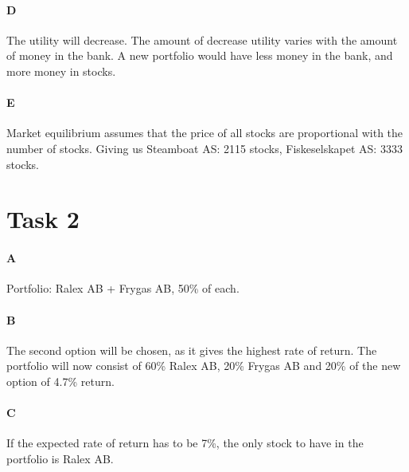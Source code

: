 \documentclass[12pt, a4paper]{article}
\begin{document}
\paragraph{D}
The utility will decrease. The amount of decrease utility varies with the
amount of money in the bank. 
A new portfolio would have less money in the bank, and more money in stocks.

\paragraph{E}
Market equilibrium assumes that the price of all stocks are proportional with
the number of stocks. Giving us Steamboat AS: 2115 stocks, Fiskeselskapet AS:
3333 stocks. 

\section{Task 2}
\paragraph{A}
Portfolio: Ralex AB + Frygas AB, 50\% of each. 

\paragraph{B}
The second option will be chosen, as it gives the highest rate of return. 
The portfolio will now consist of 60\% Ralex AB, 20\% Frygas AB and 20\% of the
new option of 4.7\% return. 

\paragraph{C}
If the expected rate of return has to be 7\%, the only stock to have in the
portfolio is Ralex AB. 
\end{document}
